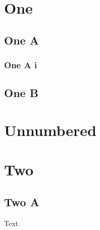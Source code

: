 \documentclass{article}
\begin{document}
\section{One}
\subsection{One A}
\subsubsection{One A i}
\subsection{One B}
\section*{Unnumbered}
\section{Two}
\subsection{Two A}
Text.
\end{document}
